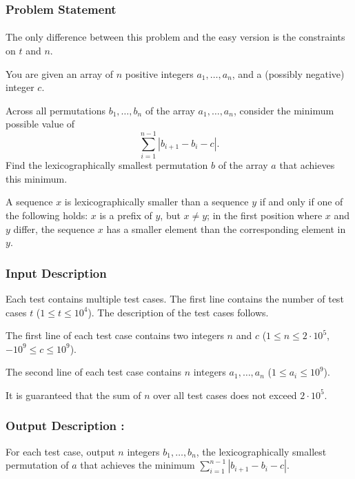 \documentclass{article}
\begin{document}
\subsubsection*{Problem Statement}
\paragraph{}The only difference between this problem and the easy version is the constraints on $t$ and $n$.

You are given an array of $n$ positive integers $a_1,\dots,a_n$, and a (possibly negative) integer $c$.

Across all permutations $b_1,\dots,b_n$ of the array $a_1,\dots,a_n$, consider the minimum possible value of $$\sum_{i=1}^{n-1} |b_{i+1}-b_i-c|.$$ Find the lexicographically smallest permutation $b$ of the array $a$ that achieves this minimum.

A sequence $x$ is lexicographically smaller than a sequence $y$ if and only if one of the following holds: $x$ is a prefix of $y$, but $x \ne y$; in the first position where $x$ and $y$ differ, the sequence $x$ has a smaller element than the corresponding element in $y$.
\paragraph{}
\subsubsection*{Input Description}Each test contains multiple test cases. The first line contains the number of test cases $t$ ($1 \le t \le 10^4$). The description of the test cases follows.

The first line of each test case contains two integers $n$ and $c$ ($1 \le n \le 2 \cdot 10^5$, $-10^9 \le c \le 10^9$).

The second line of each test case contains $n$ integers $a_1,\dots,a_n$ ($1 \le a_i \le 10^9$).

It is guaranteed that the sum of $n$ over all test cases does not exceed $2 \cdot 10^5$.
\paragraph{}
\subsubsection*{Output Description : }For each test case, output $n$ integers $b_1,\dots,b_n$, the lexicographically smallest permutation of $a$ that achieves the minimum $\sum\limits_{i=1}^{n-1} |b_{i+1}-b_i-c|$.
\end{document}
